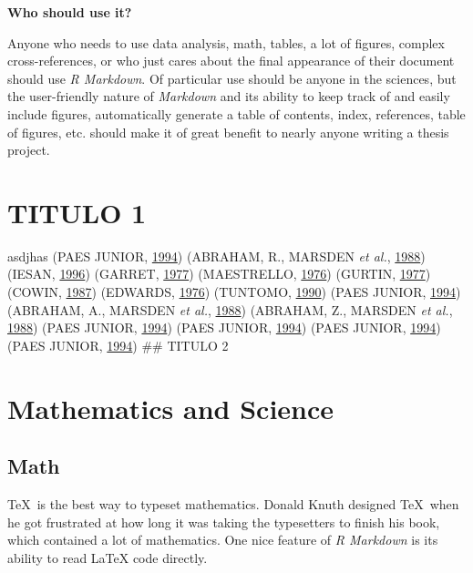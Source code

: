 \documentclass[grad,numbers]{coppe}
\begin{document}
  \textbf{Who should use it?}
  
  Anyone who needs to use data analysis, math, tables, a lot of figures, complex cross-references, or who just cares about the final appearance of their document should use \emph{R Markdown}. Of particular use should be anyone in the sciences, but the user-friendly nature of \emph{Markdown} and its ability to keep track of and easily include figures, automatically generate a table of contents, index, references, table of figures, etc. should make it of great benefit to nearly anyone writing a thesis project.
  
  \hypertarget{titulo-1}{%
  \chapter{TITULO 1}\label{titulo-1}}
  
  asdjhas (PAES JUNIOR, \protect\hyperlink{ref-phdthesis-example}{1994}) (ABRAHAM, R., MARSDEN \emph{et al.}, \protect\hyperlink{ref-book-example}{1988}) (IESAN, \protect\hyperlink{ref-article-example}{1996}) (GARRET, \protect\hyperlink{ref-techreport-exampleIn}{1977}) (MAESTRELLO, \protect\hyperlink{ref-techreport-example}{1976}) (GURTIN, \protect\hyperlink{ref-inproceedings-example}{1977}) (COWIN, \protect\hyperlink{ref-incollection-example}{1987}) (EDWARDS, \protect\hyperlink{ref-inbook-example}{1976}) (TUNTOMO, \protect\hyperlink{ref-mastersthesis-example}{1990}) (PAES JUNIOR, \protect\hyperlink{ref-phdthesis-example}{1994}) (ABRAHAM, A., MARSDEN \emph{et al.}, \protect\hyperlink{ref-teste-1}{1988}) (ABRAHAM, Z., MARSDEN \emph{et al.}, \protect\hyperlink{ref-teste-2}{1988}) (PAES JUNIOR, \protect\hyperlink{ref-phdthesis-example}{1994}) (PAES JUNIOR, \protect\hyperlink{ref-phdthesis-example}{1994}) (PAES JUNIOR, \protect\hyperlink{ref-phdthesis-example}{1994}) (PAES JUNIOR, \protect\hyperlink{ref-phdthesis-example}{1994})
  \#\# TITULO 2
  
  \hypertarget{math-sci}{%
  \chapter{Mathematics and Science}\label{math-sci}}
  
  \hypertarget{math}{%
  \section{Math}\label{math}}
  
  \TeX~is the best way to typeset mathematics. Donald Knuth designed \TeX~when he got frustrated at how long it was taking the typesetters to finish his book, which contained a lot of mathematics. One nice feature of \emph{R Markdown} is its ability to read LaTeX code directly.
  
\end{document}
